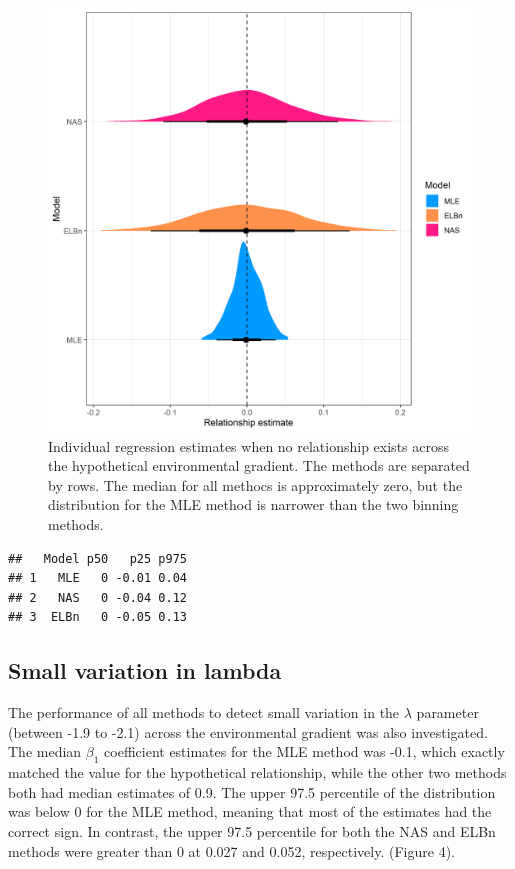 \documentclass[
]{article}
\begin{document}
\begin{figure}
\centering
\includegraphics{figures/PLB_static_b_relationship_density.png}
\caption{Individual regression estimates when no relationship exists
across the hypothetical environmental gradient. The methods are
separated by rows. The median for all methocs is approximately zero, but
the distribution for the MLE method is narrower than the two binning
methods.}
\end{figure}

\begin{verbatim}
##   Model p50   p25 p975
## 1   MLE   0 -0.01 0.04
## 2   NAS   0 -0.04 0.12
## 3  ELBn   0 -0.05 0.13
\end{verbatim}

\hypertarget{small-variation-in-lambda}{%
\subsection{Small variation in lambda}\label{small-variation-in-lambda}}

The performance of all methods to detect small variation in the
\(\lambda\) parameter (between -1.9 to -2.1) across the environmental
gradient was also investigated. The median \(\beta_1\) coefficient
estimates for the MLE method was -0.1, which exactly matched the value
for the hypothetical relationship, while the other two methods both had
median estimates of 0.9. The upper 97.5 percentile of the distribution
was below 0 for the MLE method, meaning that most of the estimates had
the correct sign. In contrast, the upper 97.5 percentile for both the
NAS and ELBn methods were greater than 0 at 0.027 and 0.052,
respectively. (Figure 4).
\end{document}
